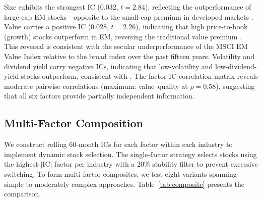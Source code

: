 \documentclass[12pt]{article}
\begin{document}
Size exhibits the strongest IC (0.032, $t = 2.84$), reflecting the outperformance of large-cap EM stocks---opposite to the small-cap premium in developed markets \citep{famafrench1993}. Value carries a positive IC (0.028, $t = 2.26$), indicating that high price-to-book (growth) stocks outperform in EM, reversing the traditional value premium \citep{famafrench2012}. This reversal is consistent with the secular underperformance of the MSCI EM Value Index relative to the broad index over the past fifteen years. Volatility and dividend yield carry negative ICs, indicating that low-volatility and low-dividend-yield stocks outperform, consistent with \citet{ang2006}. The factor IC correlation matrix reveals moderate pairwise correlations (maximum: value--quality at $\rho = 0.58$), suggesting that all six factors provide partially independent information.

\subsection{Multi-Factor Composition}

We construct rolling 60-month ICs for each factor within each industry to implement dynamic stock selection. The single-factor strategy selects stocks using the highest-$|$IC$|$ factor per industry with a 20\% stability filter to prevent excessive switching. To form multi-factor composites, we test eight variants spanning simple to moderately complex approaches. Table~\ref{tab:composite} presents the comparison.
\end{document}
